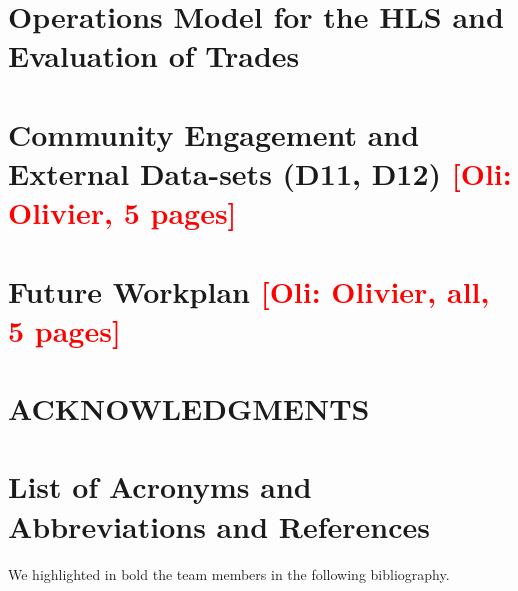 \documentclass[a4paper]{ar-1col_WFIRST-HLS}
\newcommand{\Oli}[1]{\textcolor{red}{[{\bf Oli}: #1]}}
\begin{document}
\section{Operations Model for the HLS and Evaluation of Trades}
\label{sec:operation}


\section{Community Engagement and External Data-sets (D11, D12) \Oli{Olivier, 5 pages}}
\label{sec:engagement}


\section{Future Workplan \Oli{Olivier, all, 5 pages}}
\label{sec:workplan}


\clearpage
\newpage


\section*{ACKNOWLEDGMENTS}
\label{sec:acknowledgments}


\section{List of Acronyms and Abbreviations and References}
\label{sec:acronyms}




\clearpage
\newpage


We highlighted in bold the team members in the following bibliography.




\clearpage
\newpage
\end{document}
